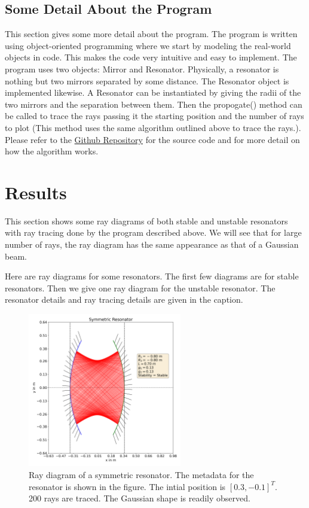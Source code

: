 \documentclass[12pt]{article}
\begin{document}
\subsection{Some Detail About the Program}
This section gives some more detail about the program. The program is written using {\color{cyan}object-oriented programming} where we start by modeling the real-world objects in code. This makes the code very intuitive and easy to implement. The program uses two objects: {\color{cyan}Mirror} and {\color{cyan}Resonator}. Physically, a resonator is nothing but two mirrors separated by some distance. The {\color{cyan}Resonator} object is implemented likewise. A {\color{cyan}Resonator} can be instantiated by giving the radii of the two mirrors and the separation between them. Then the {\color{cyan}propogate()}  method can be called to trace the rays passing it the starting position and the number of rays to plot (This method uses the same algorithm outlined above to trace the rays.). Please refer to the \href{https://github.com/Hari31416/Laser-Term-Paper}{Github Repository} for the source code and for more detail on how the algorithm works.

\section{Results}
This section shows some ray diagrams of both stable and unstable resonators with ray tracing done by the program described above. We will see that for large number of rays, the ray diagram has the same appearance as that of a Gaussian beam.

Here are ray diagrams for some resonators. The first few diagrams are for stable resonators. Then we give one ray diagram for the unstable resonator. The resonator details and ray tracing details are given in the caption.
\begin{figure}[h]
    \centering
    \includegraphics[width=0.6\textwidth]{images/symmetric.png}
    \caption{Ray diagram of a symmetric resonator. The metadata for the resonator is shown in the figure. The intial position is \([0.3, -0.1]^T\). 200 rays are traced. The Gaussian shape is readily observed.}
    \label{fig:symmetric}
\end{figure}
\end{document}
